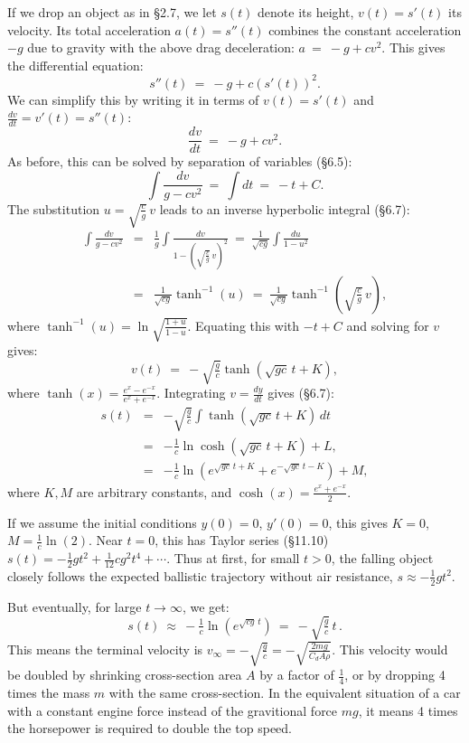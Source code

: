 \documentclass[11pt]{article}
\begin{document}
If we drop an object as in \S2.7, 
we let $s(t)$ denote its height, $v(t)=s'(t)$ its velocity.
Its total acceleration $a(t)=s''(t)$ combines 
the constant acceleration $-g$ due to gravity with the above drag
deceleration: $a \  =\ -g + cv^2$. This gives the differential equation:
$$
s''(t) \ =\ -g + c(s'(t))^2.
$$
We can simplify this by writing it in terms of $v(t)=s'(t)$ and $\frac{dv}{dt}=v'(t) = s''(t)$:
$$
 \frac{dv}{dt} \ = \ -g+c v^2.
$$
As before, this can be solved by separation of variables (\S6.5):
$$
\int \frac{dv}{g-cv^2} \ =\ \int dt \ =\ -t + C.
$$
The substitution $u=\sqrt{\frac cg}\,v$ leads to an inverse hyperbolic integral (\S6.7):
$$\begin{array}{rcl}
\int \frac{dv}{g-cv^2} &=& 
\frac 1g\int \frac{dv}{1-(\sqrt{\frac cg}\, v)^2} \ =\ 
\frac 1{\sqrt{cg}} \int \frac{du}{1-u^2}
\\[1.3em]
&=&  \frac 1{\sqrt{cg}}\tanh^{-1}(u)
\ = \ \frac 1{\sqrt{cg}}\tanh^{-1}(\sqrt{\frac cg}\,v),
\end{array}$$
where $\tanh^{-1}(u) = \ln\!\sqrt{\frac{1+u}{1-u}}$. Equating this with $-t+C$ and solving for $v$ gives:
$$
 v(t) \ = \ -\sqrt{\tfrac gc}\tanh(\sqrt{gc}\, t +K),
$$
where $\tanh(x) = \frac{e^x-e^{-x}}{e^x+e^{-x}}$. Integrating $v=\tfrac{dy}{dt}$ gives (\S6.7):
$$\begin{array}{rcl}
s(t) &=& -\sqrt{\tfrac gc}\int \tanh(\sqrt{gc}\,t+K)\,dt
\\[.5em]
&=&  -\tfrac1c \ln \cosh(\sqrt{gc}\, t + K) + L,
\\[.5em]
&=&   -\tfrac1c \ln(e^{\sqrt{gc}\, t + K} + e^{-\sqrt{gc}\, t - K}) + M,
\end{array}$$
where $K,M$ are arbitrary constants, and 
$\cosh(x) = \frac{e^x+e^{-x}}{2}$.

If we assume the initial conditions $y(0)=0$, $y'(0)=0$,
this gives $K=0$, $M=\frac 1c\ln(2)$.
Near $t=0$, this has Taylor series (\S11.10) \
$
s(t)=-\tfrac12 g t^2 + \tfrac1{12} c g^2 t^4 +\cdots
$.
Thus at first, for small $t>0$, the falling object closely 
follows the expected ballistic trajectory 
 without air resistance, $s \approx -\frac12 g t^2$.

But eventually, for large $t\to\infty$, we get:
$$
s(t) \ \approx\  -\tfrac1c \ln(e^{\sqrt{c g}\, t}) 
\ =\ -\sqrt{\tfrac gc}\, t \,.
$$
This means the terminal velocity is $v_{\infty}=-\sqrt{\tfrac gc}=-\sqrt{\frac{2mg}{C_d A\rho}}$.
This velocity would be doubled by shrinking cross-section area $A$ by a factor of $\frac14$,
or by dropping 4 times the mass $m$ with the same cross-section.
In the equivalent situation of a car with a constant engine force 
instead of the gravitional force $mg$, 
it means 4 times the horsepower is required to double the top speed.
\end{document}
